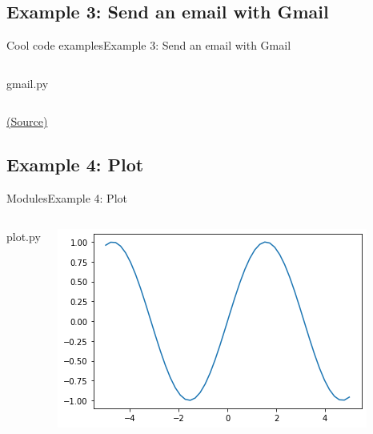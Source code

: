 \documentclass[10pt,compress]{beamer} %
\begin{document}
\subsection{Example 3: Send an email with Gmail}
\begin{frame}{Cool code examples}{Example 3: Send an email with Gmail}
	\begin{columns}
		\vspace{-0.2cm}
		\begin{exampleblock}{gmail.py}
		\vspace{-0.2cm}
		
		\end{exampleblock}
	\end{columns}

	\centering \tiny{\href{http://www.pythonforbeginners.com/code-snippets-source-code/using-python-to-send-email/}{(Source)}}
\end{frame}

\subsection{Example 4: Plot}
\begin{frame}{Modules}{Example 4: Plot}
	\begin{columns}
 	   \column{.60\textwidth}

		\vspace{-0.2cm}
		\begin{exampleblock}{plot.py}
		\vspace{-0.2cm}
		
		\vspace{-0.2cm}
		\end{exampleblock}

  		\column{.50\textwidth}
		\vspace{-0.2cm}
		\centering \includegraphics[width=\linewidth]{figs/plot.png}\\
	\end{columns}
		\vspace{-0.2cm}
\end{frame}
\end{document}
